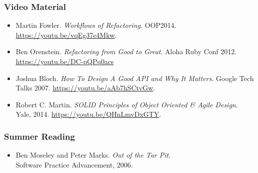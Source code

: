 \begin{frame}

\frametitle{Video Material}

\footnotesize

\begin{itemize}

\item Martin Fowler. \emph{Workflows of Refactoring}. OOP2014.
\url{https://youtu.be/vqEg37e4Mkw}.

\item Ben Orenstein. \emph{Refactoring from Good to Great}. Aloha Ruby Conf
2012. \url{https://youtu.be/DC-pQPq0acs}

\item Joshua Bloch. \emph{How To Design A Good API and Why It Matters}. Google
Tech Talks 2007. \url{https://youtu.be/aAb7hSCtvGw}.

\item Robert C. Martin. \emph{SOLID Principles of Object Oriented \& Agile
Design}. Yale, 2014. \url{https://youtu.be/QHnLmvDxGTY}.


\end{itemize}

\end{frame}


\begin{frame}

\frametitle{Summer Reading}

\footnotesize

\begin{itemize}

\item Ben Moseley and Peter Marks. \emph{Out of the Tar Pit}. \\ Software
Practice Advancement, 2006.

\end{itemize}

\end{frame}
